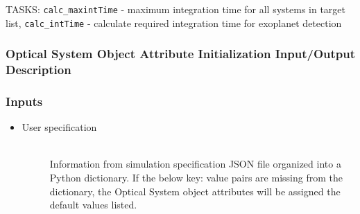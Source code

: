 \documentclass[cleanfoot]{asme2ej}
\begin{document}
TASKS: \verb+calc_maxintTime+ - maximum integration time for all systems in target list, \verb+calc_intTime+ - calculate required integration time for exoplanet detection


\label{sec:opticalsystem}
\subsubsection{Optical System Object Attribute Initialization Input/Output Description} 
\subsubsection*{Inputs}
\begin{itemize}
    \item
    \begin{description}
        \item[User specification] \hfill \\
        Information from simulation specification JSON file organized into a Python dictionary. If the below key: value pairs are missing from the dictionary, the Optical System object attributes will be assigned the default values listed.
\end{description}
\end{itemize}
\end{document}
